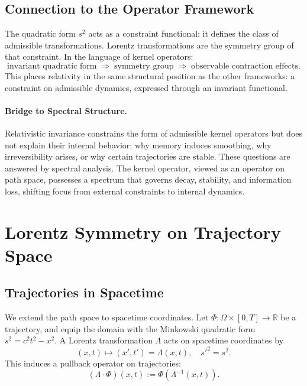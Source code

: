 \documentclass[12pt]{article}
\newcommand{\R}{\mathbb{R}}
\begin{document}
\subsection{Connection to the Operator Framework}

The quadratic form $s^2$ acts as a constraint functional: it defines the
class of admissible transformations. Lorentz transformations are the symmetry
group of that constraint. In the language of kernel operators:
\[
  \text{invariant quadratic form} \;\Rightarrow\; \text{symmetry group}
  \;\Rightarrow\; \text{observable contraction effects}.
\]
This places relativity in the same structural position as the other frameworks:
a constraint on admissible dynamics, expressed through an invariant functional.

\paragraph{Bridge to Spectral Structure.}
Relativistic invariance constrains the form of admissible kernel operators
but does not explain their internal behavior: why memory induces smoothing,
why irreversibility arises, or why certain trajectories are stable. These
questions are answered by spectral analysis. The kernel operator, viewed as
an operator on path space, possesses a spectrum that governs decay,
stability, and information loss, shifting focus from external constraints
to internal dynamics.

\section{Lorentz Symmetry on Trajectory Space}
\label{sec:lorentz}

\subsection{Trajectories in Spacetime}

We extend the path space to spacetime coordinates. Let
$\Phi \colon \Omega \times [0,T] \to \R$ be a trajectory, and equip the
domain with the Minkowski quadratic form $s^2 = c^2t^2 - x^2$. A Lorentz
transformation $\Lambda$ acts on spacetime coordinates by
\[
  (x,t) \mapsto (x',t') = \Lambda(x,t), \quad s'^2 = s^2.
\]
This induces a pullback operator on trajectories:
\[
  (\Lambda\cdot\Phi)(x,t) := \Phi(\Lambda^{-1}(x,t)).
\]
\end{document}
